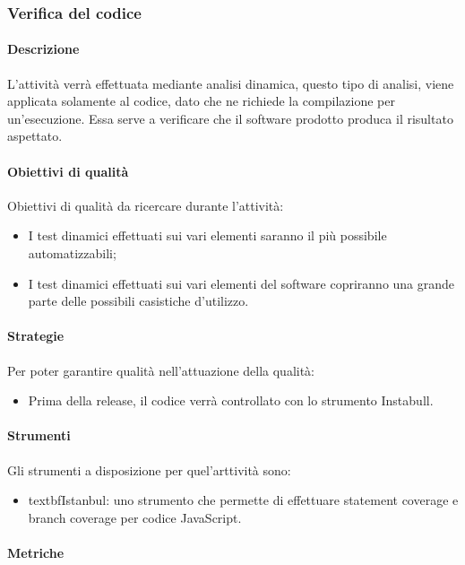 \documentclass[../NormeDiProgetto_v4.0.0.tex]{subfiles}
\begin{document}
		\subsubsection{Verifica del codice}
			\paragraph{Descrizione}					
				L'attività verrà effettuata mediante analisi dinamica, questo tipo di analisi, viene applicata solamente al codice, dato che ne richiede la compilazione per un'esecuzione. Essa serve a verificare che il software prodotto produca il risultato aspettato.

			\paragraph{Obiettivi di qualità}
				Obiettivi di qualità da ricercare durante l'attività:
				\begin{itemize}
					\item I test dinamici effettuati sui vari elementi saranno il più possibile automatizzabili;
					\item I test dinamici effettuati sui vari elementi del software copriranno una grande parte delle possibili casistiche d'utilizzo.
				\end{itemize}
			
			\paragraph{Strategie}
				Per poter garantire qualità nell'attuazione della qualità:
				\begin{itemize}
					\item Prima della release, il codice verrà controllato con lo strumento Instabull.
				\end{itemize}

			\paragraph{Strumenti}
				Gli strumenti a disposizione per quel'arttività sono:
				\begin{itemize}
					\item textbf{Istanbul}: uno strumento che permette di effettuare statement coverage e branch coverage per codice JavaScript.  
				\end{itemize}

			\paragraph{Metriche}\mbox{}\\
\end{document}
